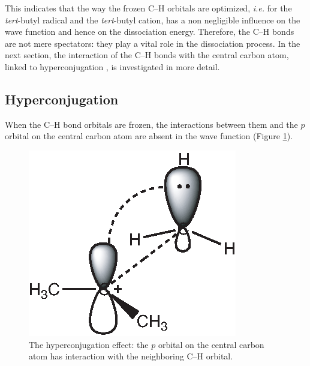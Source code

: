 This indicates that the way the frozen C--H orbitals are optimized, \textit{i.e.} for the \textit{tert}-butyl radical and the \textit{tert}-butyl cation, has a non negligible influence on the wave function and hence on the dissociation energy. Therefore, the C--H bonds are not mere spectators: they play a vital role in the dissociation process. In the next section, the interaction of the C--H bonds with the central carbon atom, linked to hyperconjugation \cite{march,mcmurry}, is investigated in more detail.
 
\subsection{Hyperconjugation}

When the C--H bond orbitals are frozen, the interactions between them and the $p$ orbital on the central carbon atom are absent in the wave function (Figure \ref{ch3.fig.hyperconjugation}).
\begin{figure}[ht]
\center
\includegraphics{dissociation/figures/hyperconj.eps}
\caption{The hyperconjugation effect: the $p$ orbital on the central carbon atom has interaction with the neighboring C--H orbital.}
\label{ch3.fig.hyperconjugation}
\end{figure}

